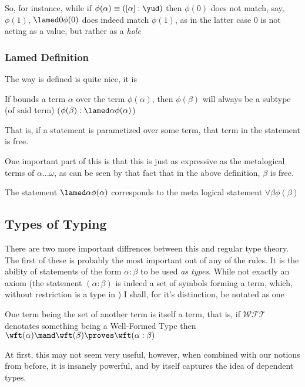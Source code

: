 So, for instance, while if $\phi (\alpha) \equiv ([\alpha] : \yud)$ then $\phi(0)$ does not match, say, $\phi(1)$, $\lamed 0 \phi(0)$ does indeed match $\phi(1)$, as in the latter case $0$ is not acting as a value, but rather as a \emph{hole}

\subsubsection{Lamed Definition}
The way \lamed is defined is quite nice, it is
\begin{axiom}[Specialization]\label{spec}
	If \lamed bounds a term $\alpha$ over the term $\phi(\alpha)$, then $\phi(\beta)$ will always be a subtype (of said term) ($\phi(\beta) : \lamed\alpha\phi(\alpha)$)
\end{axiom}

That is, if a statement is parametized over some term, that term in the statement is free.

One important part of this is that this is just as expressive as the metalogical terms of $\alpha$...$\omega$, as can be seen by that fact that in the above definition, $\beta$ is free.



\begin{rem}
	The statement $\lamed \alpha \phi(\alpha)$ corresponds to the meta logical statement $\forall \beta \phi (\beta)$
\end{rem}
\subsection{Types of Typing}

There are two more important diffrences between this and regular type theory.
The first of these is probably the most important out of any of the rules.
It is the ability of statements of the form $\alpha : \beta$ to be used \emph{as types}.
While not exactly an axiom (the statement $(\alpha : \beta)$ is indeed a set of symbols forming a term, which, without restriction is a type in \this) I shall, for it's distinction, be notated as one

\begin{axiom}
	One term being the set of another term is itself a term, that is, if $\mathcal{WFT}$ denotates something being a Well-Formed Type then $\wft (\alpha) \mand \wft (\beta) \proves \wft (\alpha : \beta)$
\end{axiom}
At first, this may not seem very useful, however, when combined with our notions from before, it is insanely powerful, and by itself captures the idea of dependent types.

